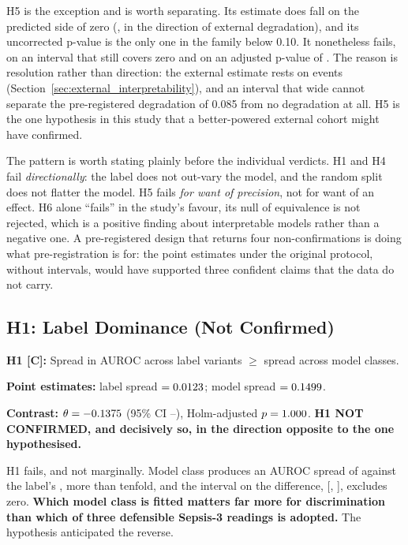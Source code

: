 H5 is the exception and is worth separating. Its estimate does fall on the
predicted side of zero (\pcHFiveEst, in the direction of external degradation),
and its uncorrected p-value is the only one in the family below 0.10. It
nonetheless fails, on an interval that still covers zero and on an adjusted
p-value of \pcHFivePHolm. The reason is resolution rather than direction: the
external estimate rests on \pcExtNEventsB{} events
(Section~\ref{sec:external_interpretability}), and an interval that wide cannot
separate the pre-registered degradation of 0.085 from no degradation at all.
H5 is the one hypothesis in this study that a better-powered external cohort
might have confirmed.

The pattern is worth stating plainly before the individual verdicts. H1 and H4
fail \emph{directionally}: the label does not out-vary the model, and the random
split does not flatter the model. H5 fails \emph{for want of precision}, not for
want of an effect. H6 alone ``fails'' in the study's favour, its null of
equivalence is not rejected, which is a positive finding about interpretable
models rather than a negative one. A pre-registered design that returns four
non-confirmations is doing what pre-registration is for: the point estimates
under the original protocol, without intervals, would have supported three
confident claims that the data do not carry.

\subsection{H1: Label Dominance (Not Confirmed)}

\begin{mdframed}[backgroundcolor=ATUOrange!20, linecolor=ATUOrange]
    \textbf{H1 [C]:} Spread in AUROC across label variants $\geq$ spread across
    model classes.

    \textbf{Point estimates:} label spread $= 0.0123$;
    model spread $= 0.1499$.

    \textbf{Contrast:} $\theta = -0.1375$ (95\% CI
    \pcHOneCiLo--\pcHOneCiHi), Holm-adjusted $p = 1.000$.
    \textbf{H1 NOT CONFIRMED, and decisively so, in the direction opposite
    to the one hypothesised.}
\end{mdframed}

H1 fails, and not marginally. Model class produces an AUROC spread of
\pcSpreadModelClass{} against the label's \pcSpreadLabel{}, more than
tenfold, and the interval on the difference,
[\pcHOneCiLo, \pcHOneCiHi], excludes zero. \textbf{Which model class is fitted
matters far more for discrimination than which of three defensible Sepsis-3
readings is adopted.} The hypothesis anticipated the reverse.

